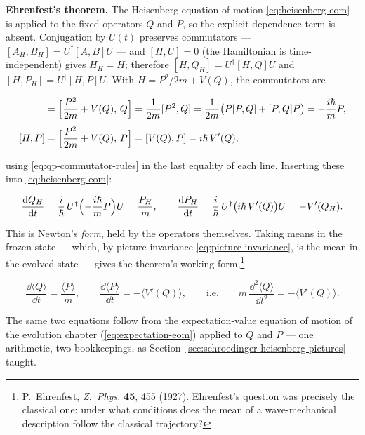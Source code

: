 \textbf{Ehrenfest's theorem.} The Heisenberg equation of motion \eqref{eq:heisenberg-eom} is applied to the fixed operators $Q$ and $P$, so the explicit-dependence term is absent. Conjugation by $U(t)$ preserves commutators --- $[A_H,B_H]=U^\dagger[A,B]U$ --- and $[H,U]=0$ (the Hamiltonian is time-independent) gives $H_H=H$; therefore $[H,Q_H]=U^\dagger[H,Q]U$ and $[H,P_H]=U^\dagger[H,P]U$. With $H=P^2/2m+V(Q)$, the commutators are
\begin{linenomath}
    \begin{align*}
        [H,Q] &= \Bigl[\frac{P^2}{2m}+V(Q),\,Q\Bigr]
               = \frac{1}{2m}[P^2,Q]
               = \frac{1}{2m}\bigl(P[P,Q]+[P,Q]P\bigr)
               = -\frac{i\hbar}{m}P,\\[4pt]
        [H,P] &= \Bigl[\frac{P^2}{2m}+V(Q),\,P\Bigr]
               = [V(Q),P]
               = i\hbar\,V'(Q),
    \end{align*}
\end{linenomath}
using \eqref{eq:qp-commutator-rules} in the last equality of each line. Inserting these into \eqref{eq:heisenberg-eom}:
\begin{linenomath}
    \begin{equation}
        \frac{\mathrm{d} Q_H}{\mathrm{d} t} = \frac{i}{\hbar}\,U^\dagger\Bigl(-\frac{i\hbar}{m}P\Bigr)U = \frac{P_H}{m},
        \qquad
        \frac{\mathrm{d} P_H}{\mathrm{d} t} = \frac{i}{\hbar}\,U^\dagger\bigl(i\hbar\,V'(Q)\bigr)U = -V'(Q_H).
    \end{equation}
\end{linenomath}
This is Newton's \emph{form}, held by the operators themselves. Taking means in the frozen state --- which, by picture-invariance \eqref{eq:picture-invariance}, is the mean in the evolved state --- gives the theorem's working form,\footnote{P.~Ehrenfest, \emph{Z.~Phys.} \textbf{45}, 455 (1927). Ehrenfest's question was precisely the classical one: under what conditions does the mean of a wave-mechanical description follow the classical trajectory?}
\begin{linenomath}
    \begin{equation}
        \frac{\dd\langle Q\rangle}{\dd t} = \frac{\langle P\rangle}{m},
        \qquad
        \frac{\dd\langle P\rangle}{\dd t} = -\bigl\langle V'(Q)\bigr\rangle,
        \qquad\text{i.e.}\qquad
        m\,\frac{\dd^2\langle Q\rangle}{\dd t^2} = -\bigl\langle V'(Q)\bigr\rangle.
        \label{eq:ehrenfest}
    \end{equation}
\end{linenomath}
The same two equations follow from the expectation-value equation of motion of the evolution chapter (\eqref{eq:expectation-eom}) applied to $Q$ and $P$ --- one arithmetic, two bookkeepings, as Section~\ref{sec:schroedinger-heisenberg-pictures} taught.

